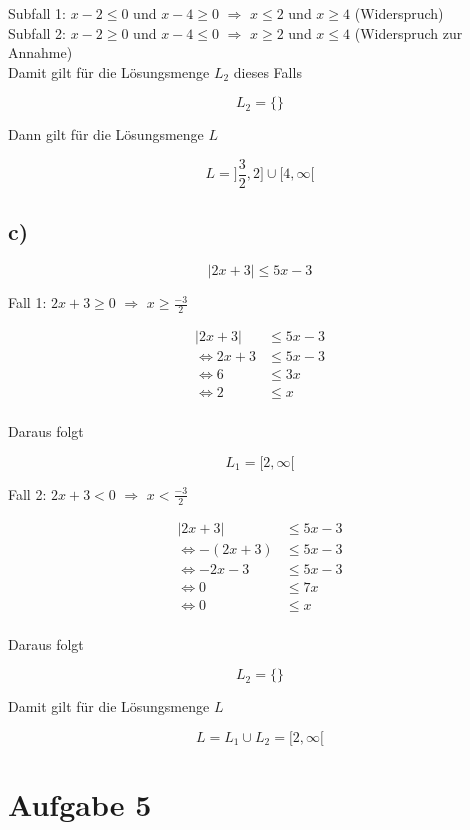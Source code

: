\documentclass[a4paper, 11pt]{article}
\begin{document}
Subfall 1:  \(x - 2 \leq 0\) und \(x - 4 \geq 0\) \(\Rightarrow\) \(x \leq 2\) und \(x \geq 4\) (Widerspruch) \\
Subfall 2:  \(x - 2 \geq 0\) und \(x - 4 \leq 0\) \(\Rightarrow\) \(x \geq 2\) und \(x \leq 4\) (Widerspruch zur Annahme) \\

Damit gilt für die Lösungsmenge \(L_2\) dieses Falls

$$ L_2 = \{\} $$

Dann gilt für die Lösungsmenge \(L\)

$$ L = ]\frac{3}{2}, 2] \cup [4, \infty[ $$

\subsection{c)}
\label{sec:org2e1cb5b}
$$ |2x + 3| \leq 5x - 3 $$

Fall 1: \(2x + 3 \geq 0\) \(\Rightarrow\) \(x \geq \frac{-3}{2}\)

\begin{align*}
    |2x + 3| &\leq 5x - 3 \\
    \Leftrightarrow 2x + 3 &\leq 5x - 3 \\
    \Leftrightarrow 6 &\leq 3x \\
    \Leftrightarrow 2 &\leq x \\
\end{align*}

Daraus folgt

$$ L_1 = [2, \infty[ $$

Fall 2:  \(2x + 3 < 0\) \(\Rightarrow\) \(x < \frac{-3}{2}\)

\begin{align*}
    |2x + 3| &\leq 5x - 3 \\
    \Leftrightarrow -(2x + 3) &\leq 5x - 3 \\
    \Leftrightarrow -2x - 3 &\leq 5x - 3 \\
    \Leftrightarrow 0 &\leq 7x \\
    \Leftrightarrow 0 &\leq x \\
\end{align*}

Daraus folgt

$$ L_2 = \{\} $$

Damit gilt für die Lösungsmenge \(L\)

$$ L = L_1 \cup L_2 = [2, \infty[ $$

\section{Aufgabe 5}
\label{sec:org608a1a8}
\end{document}
